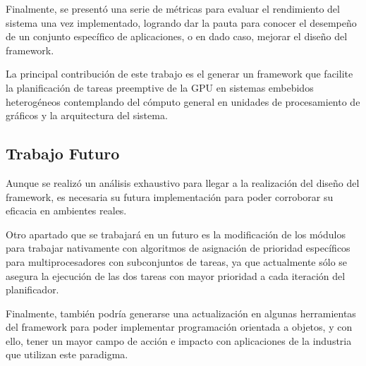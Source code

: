 Finalmente, se presentó una serie de métricas para evaluar el rendimiento del sistema una vez implementado, logrando dar la pauta para conocer el desempeño de un conjunto específico de aplicaciones, o en dado caso, mejorar el diseño del framework.
\newline

La principal contribución de este trabajo es el generar un framework que facilite la planificación de tareas preemptive de la GPU en sistemas embebidos heterogéneos contemplando del cómputo general en unidades de procesamiento de gráficos y la arquitectura del sistema.

\subsection{Trabajo Futuro}
Aunque se realizó un análisis exhaustivo para llegar a la  realización del diseño del framework, es necesaria su futura implementación para poder corroborar su eficacia en ambientes reales.
\newline

Otro apartado que se trabajará en un futuro es la modificación de los módulos para trabajar nativamente con algoritmos de asignación de prioridad específicos para multiprocesadores con subconjuntos de tareas, ya que actualmente sólo se asegura la ejecución de las dos tareas con mayor prioridad a cada iteración del planificador.  
\newline

Finalmente, también podría generarse una actualización en algunas herramientas del framework para poder implementar programación orientada a objetos, y con ello, tener un mayor campo de acción e impacto con aplicaciones de la industria que utilizan este paradigma. 